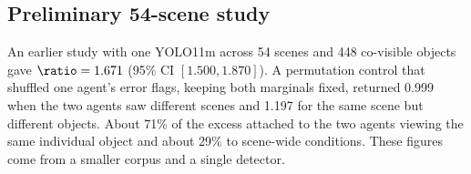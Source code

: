 \subsection{Preliminary 54-scene study}
An earlier study with one YOLO11m across 54 scenes and 448 co-visible objects
gave $\ratio=1.671$ (95\% CI $[1.500,1.870]$). A permutation control that
shuffled one agent's error flags, keeping both marginals fixed, returned
0.999 when the two agents saw different scenes and 1.197 for the same scene
but different objects. About 71\% of the excess attached to the two agents
viewing the same individual object and about 29\% to scene-wide conditions.
These figures come from a smaller corpus and a single detector.
